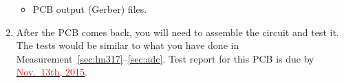\documentclass[letterpaper, 11pt]{article}
\newcommand{\due}[1]{\href{https://github.com/ucdart/UCD-EEC134/blob/master/support/schedule/eec134-schedule.pdf}{\textcolor{red}{#1}}}
\begin{document}
\begin{enumerate}
\begin{itemize}
			\item PCB output (Gerber) files.
		\end{itemize}

	\item After the PCB comes back, you will need to assemble the circuit and test it. The tests would be similar to what you have done in Measurement~\ref{sec:lm317}--\ref{sec:adc}. Test report for this PCB is due by \due{Nov.~13th, 2015}.
\end{enumerate}


%
%
\end{document}
